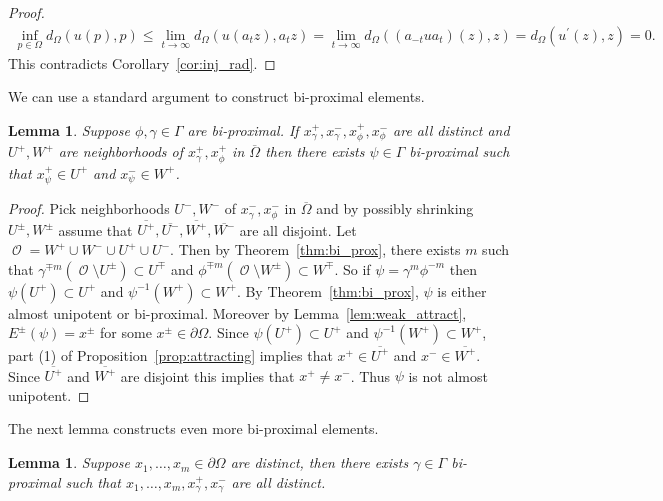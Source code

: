 \documentclass[12pt]{amsart}
\theoremstyle{plain}
\newtheorem{lemma}[proposition]{Lemma}
\theoremstyle{definition}
\theoremstyle{remark}
\begin{document}
\begin{proof}
\begin{align*}
\inf_{p \in \Omega} d_{\Omega}\left(u (p),p\right) \leq \lim_{t \rightarrow \infty} d_{\Omega}\left(u(a_t z), a_t z\right) = \lim_{t \rightarrow \infty} d_{\Omega}\left((a_{-t}ua_t)( z), z\right) =d_{\Omega}\left(u^\prime(z), z\right)=0.
\end{align*}
This contradicts Corollary~\ref{cor:inj_rad}. 
\end{proof}

We can use a standard argument to construct bi-proximal elements.
 
\begin{lemma}
\label{lem:str_1}
Suppose $\phi, \gamma \in \Gamma$ are bi-proximal. If $x^+_{\gamma}, x^-_{\gamma}, x^+_{\phi}, x^-_{\phi}$ are all distinct and $U^+, W^+$ are neighborhoods of $x^+_{\gamma}, x^+_{\phi}$ in $\overline{\Omega}$ then there exists $\psi \in \Gamma$ bi-proximal such that $x^+_{\psi} \in U^+$ and $x^-_{\psi} \in W^+$.
\end{lemma}

\begin{proof}
Pick neighborhoods $U^-,W^-$ of $x^-_{\gamma}, x^-_{\phi}$ in $\overline{\Omega}$ and by possibly shrinking $U^\pm, W^\pm$ assume that $\overline{U^+},\overline{U^-},\overline{W^+},\overline{W^-}$ are all disjoint. Let $\operatorname{\mathcal{O}}= W^+ \cup W^- \cup U^+ \cup U^-$. Then by Theorem~\ref{thm:bi_prox}, there exists $m$ such that $\gamma^{ \mp m}( \operatorname{\mathcal{O}} \setminus U^\pm) \subset U^\mp$ and $\phi^{ \mp m}(\operatorname{\mathcal{O}} \setminus W^\pm) \subset W^\mp$. So if $\psi = \gamma^m\phi^{-m}$ then $\psi(U^+) \subset U^+$ and $\psi^{-1}(W^+) \subset W^+$. By Theorem~\ref{thm:bi_prox}, $\psi$ is either almost unipotent or bi-proximal. Moreover by Lemma~\ref{lem:weak_attract}, $E^{\pm}(\psi) = x^{\pm}$ for some $x^\pm \in \partial \Omega$. Since $\psi(U^+) \subset U^+$ and $\psi^{-1}(W^+) \subset W^+$,  part (1) of Proposition~\ref{prop:attracting} implies that $x^+ \in \overline{U^+}$ and $x^- \in \overline{W^+}$. Since $\overline{U^+}$ and $\overline{W^+}$ are disjoint this implies that $x^+ \neq x^-$. Thus $\psi$ is not almost unipotent.
\end{proof}

The next lemma constructs even more bi-proximal elements.

\begin{lemma}
\label{lem:str_4}
Suppose $x_1,\dots, x_m \in \partial \Omega$ are distinct, then there exists $\gamma \in \Gamma$ bi-proximal such that $x_1,\dots, x_m,x^+_{\gamma}, x^-_{\gamma}$ are all distinct.
\end{lemma}
\end{document}
